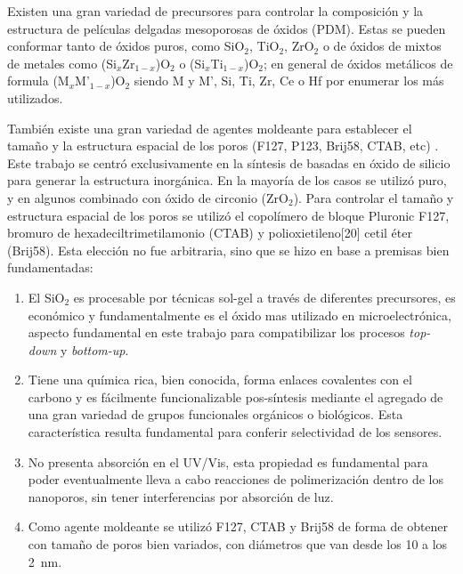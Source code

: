 	Existen una gran variedad de precursores para controlar la composición y la estructura de películas delgadas mesoporosas de óxidos (PDM). Estas se pueden conformar tanto de óxidos puros, como SiO$_2$, TiO$_2$, ZrO$_2$ o de óxidos de mixtos de metales como (Si$_x$Zr$_{1-x}$)O$_2$ o (Si$_x$Ti$_{1-x}$)O$_2$; en general de óxidos metálicos de formula (M$_{x}$M'$_{1-x}$)O$_2$ siendo M y M', Si, Ti, Zr, Ce o Hf por enumerar los más utilizados.

	También existe una gran variedad de agentes moldeante para establecer el tamaño y la estructura espacial de los poros (F127, P123, Brij58, CTAB, etc) \cite{angelome2011,schuth2013,Soler-Illia2006,Soler-Illia2002a}. Este trabajo se centró exclusivamente en la síntesis de \pdm\space basadas en óxido de silicio para generar la estructura inorgánica. En la mayoría de los casos se utilizó puro, y en algunos combinado con óxido de circonio (ZrO$_2$). Para controlar el tamaño y estructura espacial de los poros se utilizó el copolímero de bloque Pluronic F127, bromuro de hexadeciltrimetilamonio (CTAB) y polioxietileno[20] cetil éter (Brij58). Esta elección no fue arbitraria, sino que se hizo en base a premisas bien fundamentadas:
		
		\begin{enumerate}

		\item El SiO$_2$ es procesable por técnicas sol-gel a través de diferentes precursores, es económico y fundamentalmente es el óxido mas utilizado en microelectrónica, aspecto fundamental en este trabajo para compatibilizar los procesos \textit{top-down} y \textit{bottom-up}.

		\item Tiene una química rica, bien conocida, forma enlaces covalentes con el carbono y es fácilmente funcionalizable pos-síntesis mediante el agregado de una gran variedad de grupos funcionales orgánicos o biológicos. Esta característica resulta fundamental para conferir selectividad de los sensores.

		\item No presenta absorción en el UV/Vis, esta propiedad es fundamental para poder eventualmente lleva a cabo reacciones de polimerización dentro de los nanoporos, sin tener interferencias por absorción de luz.

		\item Como agente moldeante se utilizó F127, CTAB y Brij58 de forma de obtener \pdm\space con tamaño de poros bien variados, con diámetros que van desde los 10 a los \SI{2}{\nm}.

		\end{enumerate}
	
